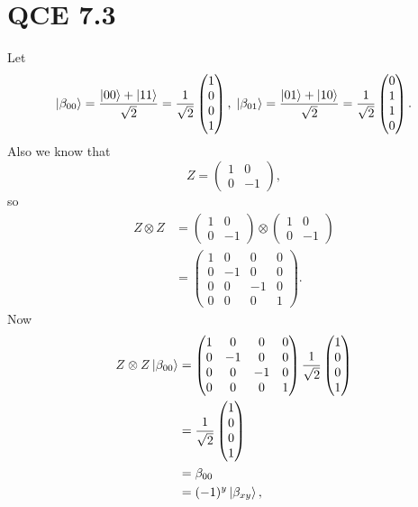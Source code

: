 \documentclass[10pt]{article}
\begin{document}
\section*{QCE 7.3}
Let
\[
\ket{\beta_{00}} = \frac{\ket{00} + \ket{11}}{\sqrt{2}} 
= \frac{1}{\sqrt{2}} 
\begin{pmatrix}
1 \\
0 \\
0 \\
1
\end{pmatrix},
 \; 
 \ket{\beta_{01}} = \frac{\ket{01} + \ket{10}}{\sqrt{2}} 
 =
\frac{1}{\sqrt{2}} 
 \begin{pmatrix}
 0 \\
 1 \\
 1 \\
 0
 \end{pmatrix}.
\]
Also we know that
\[
Z = \begin{pmatrix}
1 & 0 \\
0 & - 1
\end{pmatrix},
\]
so 
\begin{align*}
Z \otimes Z &= \begin{pmatrix}
1 & 0 \\
0 & - 1
\end{pmatrix}
\otimes
\begin{pmatrix}
1 & 0 \\
0 & - 1
\end{pmatrix} \\
&= 
\begin{pmatrix}
1 &  0  & 0   & 0 \\
0 & -1 & 0   & 0 \\
0 &  0  & -1 & 0 \\
0 &  0  &  0  & 1
\end{pmatrix}.
\end{align*}
Now
\begin{align*}
Z \otimes Z \ket{\beta_{00}} &= \begin{pmatrix}
1 &  0  & 0   & 0 \\
0 & -1 & 0   & 0 \\
0 &  0  & -1 & 0 \\
0 &  0  &  0  & 1
\end{pmatrix}
\frac{1}{\sqrt{2}} 
\begin{pmatrix}
1 \\
0 \\
0 \\
1
\end{pmatrix} \\
&= \frac{1}{\sqrt{2}}
\begin{pmatrix}
1 \\
0 \\
0 \\
1
\end{pmatrix} \\
&= \beta_{00} \\
&= (-1)^y \ket{\beta_{xy}},
\end{align*}
\end{document}
